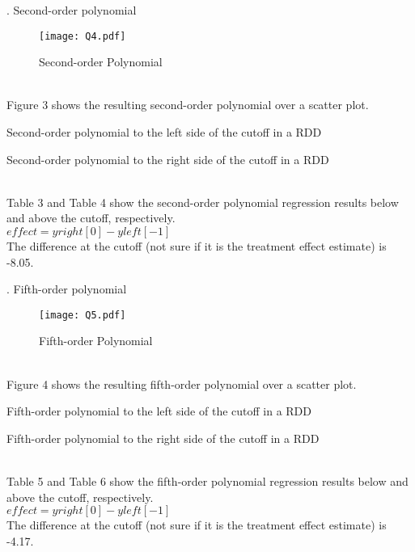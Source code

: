 \documentclass{article}
\begin{document}
. Second-order polynomial
\smallskip
\begin{figure}[H]
    \centering
    \texttt{[image: Q4.pdf]}
    \caption{Second-order Polynomial}
    \label{fig:Q4}
\end{figure}
\noindent
\\ Figure 3 shows the resulting second-order polynomial over a scatter plot. 
\begin{table}[H]
    \centering
    
    \caption{Second-order polynomial to the left side of the cutoff in a RDD}
    \label{tab:Q4L}
\end{table}
\begin{table}[H]
    \centering
    
    \caption{Second-order polynomial to the right side of the cutoff in a RDD}
    \label{tab:Q4R}
\end{table}
\noindent
\\ Table 3 and Table 4 show the second-order polynomial regression results below and above the cutoff, respectively.
\\ $effect = yright[0] - yleft[-1]$
\\ The difference at the cutoff (not sure if it is the treatment effect estimate) is -8.05.
\bigskip

. Fifth-order polynomial
\smallskip
\begin{figure}[H]
    \centering
    \texttt{[image: Q5.pdf]}
    \caption{Fifth-order Polynomial}
    \label{fig:Q5}
\end{figure}
\noindent
\\ Figure 4 shows the resulting fifth-order polynomial over a scatter plot. 
\begin{table}[H]
    \centering
    
    \caption{Fifth-order polynomial to the left side of the cutoff in a RDD}
    \label{tab:Q5L}
\end{table}
\begin{table}[H]
    \centering
    
    \caption{Fifth-order polynomial to the right side of the cutoff in a RDD}
    \label{tab:Q5R}
\end{table}
\noindent
\\ Table 5 and Table 6 show the fifth-order polynomial regression results below and above the cutoff, respectively.
\\ $effect = yright[0] - yleft[-1]$
\\ The difference at the cutoff (not sure if it is the treatment effect estimate) is -4.17.
\bigskip
\end{document}
